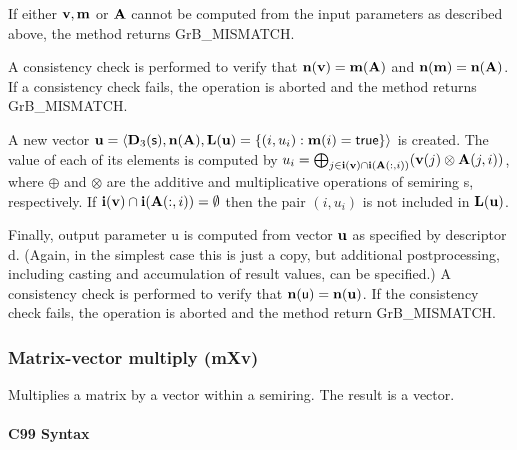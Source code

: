 If either ${\bf v}, {\bf m}$ or ${\bf A}$ cannot be computed
from the input parameters as described above, the method returns {\sf
GrB\_MISMATCH}.

A consistency check is performed to verify that $\bold{n}({\bf v})
= \bold{m}({\bf A})$ and $\bold{n}({\bf m}) =
\bold{n}({\bf A})$. If a consistency check fails, the operation is
aborted and the method returns {\sf GrB\_MISMATCH}.

A new vector ${\bf u} = \langle \bold{D}_3({\sf s}),
\bold{n}({\bf A}), \bold{L}({\bf u}) = \{(i,u_i) : {\bf m}(i)
= {\sf true} \} \rangle$ is created.  The value of each of its elements
is computed by $u_i = \bigoplus_{j \in {\bf i}({\bf v}) \cap
{\bf i}({\bf A}(:,i))} ({\bf v}(j) \otimes {\bf A}(j,i))$,
where $\oplus$ and $\otimes$ are the additive and multiplicative
operations of semiring {\sf s}, respectively.  If ${\bf i}({\bf v})
\cap {\bf i}({\bf A}(:,i)) = \emptyset$ then the pair $(i,u_i)$
is not included in $\bold{L}({\bf u})$.

Finally, output parameter {\sf u} is computed from vector ${\bf u}$
as specified by descriptor {\sf d}. (Again, in the simplest case this
is just a copy, but additional postprocessing, including casting and
accumulation of result values, can be specified.)  A consistency check is
performed to verify that $\bold{n}({\sf u}) = \bold{n}({\bf u})$. If
the consistency check fails, the operation is aborted and the method
return {\sf GrB\_MISMATCH}.

 

 

\subsubsection{Matrix-vector multiply ({\sf mXv})}

Multiplies a matrix by a vector within a semiring. The result is a vector.

\paragraph{C99 Syntax}

